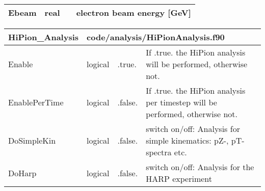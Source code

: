 \documentclass{article}
\begin{document}
\begin{longtable}{llll}
\midrule
Ebeam & \begin{minipage}[t]{2cm}real\end{minipage} & \begin{minipage}[t]{2cm}\end{minipage} & \begin{minipage}[t]{12cm}electron beam energy [GeV]\end{minipage}\\*
\bottomrule
\end{longtable}
{ }




\begin{longtable}{llll}
\toprule
\textbf{\large{HiPion\_Analysis}} & \multicolumn{3}{l}{\footnotesize{code/analysis/HiPionAnalysis.f90}}\\*
\midrule
\endfirsthead
\midrule
\endhead
Enable & \begin{minipage}[t]{2cm}logical\end{minipage} & \begin{minipage}[t]{2cm}.true.\end{minipage} & \begin{minipage}[t]{12cm}If .true. the HiPion analysis will be performed, otherwise not.\end{minipage}\\*
\midrule
EnablePerTime & \begin{minipage}[t]{2cm}logical\end{minipage} & \begin{minipage}[t]{2cm}.false.\end{minipage} & \begin{minipage}[t]{12cm}If .true. the HiPion analysis per timestep will be performed, otherwise not.\end{minipage}\\*
\midrule
DoSimpleKin & \begin{minipage}[t]{2cm}logical\end{minipage} & \begin{minipage}[t]{2cm}.false.\end{minipage} & \begin{minipage}[t]{12cm}switch on/off: Analysis for simple kinematics: pZ-, pT-spectra etc.\end{minipage}\\*
\midrule
DoHarp & \begin{minipage}[t]{2cm}logical\end{minipage} & \begin{minipage}[t]{2cm}.false.\end{minipage} & \begin{minipage}[t]{12cm}switch on/off: Analysis for the HARP experiment\end{minipage}\\*

\end{longtable}
\end{document}

